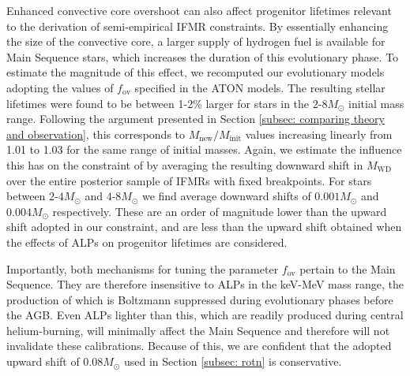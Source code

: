 Enhanced convective core overshoot can also affect progenitor lifetimes relevant to the derivation of semi-empirical IFMR constraints. By essentially enhancing the size of the convective core, a larger supply of hydrogen fuel is available for Main Sequence stars, which increases the duration of this evolutionary phase. To estimate the magnitude of this effect, we recomputed our evolutionary models adopting the values of $f_{\mathrm{ov}}$ specified in the ATON models. The resulting stellar lifetimes were found to be between 1-2\% larger for stars in the $2$-$8M_{\odot}$ initial mass range. Following the argument presented in Section \ref{subsec: comparing theory and observation}, this corresponds to $M_{\mathrm{new}}/M_{\mathrm{init}}$ values increasing linearly from 1.01 to 1.03 for the same range of initial masses. Again, we estimate the influence this has on the constraint of \cite{Andrews} by averaging the resulting downward shift in $M_{\mathrm{WD}}$ over the entire posterior sample of IFMRs with fixed breakpoints. For stars between $2$-$4M_{\odot}$ and $4$-$8M_{\odot}$ we find average downward shifts of $0.001M_{\odot}$ and $0.004M_{\odot}$ respectively. These are an order of magnitude lower than the upward shift adopted in our constraint, and are less than the upward shift obtained when the effects of ALPs on progenitor lifetimes are considered. 

Importantly, both mechanisms for tuning the parameter $f_{\mathrm{ov}}$ pertain to the Main Sequence. They are therefore insensitive to ALPs in the keV-MeV mass range, the production of which is Boltzmann suppressed during evolutionary phases before the AGB. Even ALPs lighter than this, which are readily produced during central helium-burning, will minimally affect the Main Sequence and therefore will not invalidate these calibrations. Because of this, we are confident that the adopted upward shift of $0.08M_{\odot}$ used in Section \ref{subsec: rotn} is conservative.
